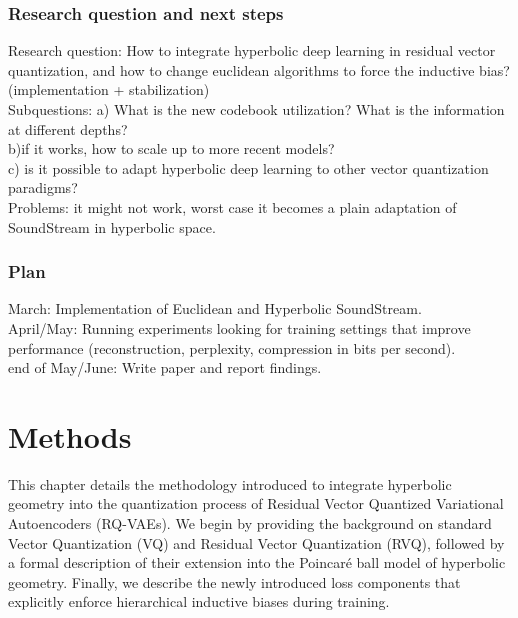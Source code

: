 \documentclass[12pt]{report}
\begin{document}
\subsection{Research question and next steps}
Research question: How to integrate hyperbolic deep learning in residual vector quantization, and how to change euclidean algorithms to force the inductive bias? (implementation + stabilization) \\
Subquestions: a) What is the new codebook utilization? What is the information at different depths? \\
b)if it works, how to scale up to more recent models? \\
c) is it possible to adapt hyperbolic deep learning to other vector quantization paradigms? \\
Problems: it might not work, worst case it becomes a plain adaptation of SoundStream in hyperbolic space.
\subsection{Plan}
March: Implementation of Euclidean and Hyperbolic SoundStream. \\
April/May: Running experiments looking for training settings that improve performance (reconstruction, perplexity, compression in bits per second). \\
end of May/June: Write paper and report findings.

\chapter{Methods}

This chapter details the methodology introduced to integrate hyperbolic geometry into the quantization process of Residual Vector Quantized Variational Autoencoders (RQ-VAEs). We begin by providing the background on standard Vector Quantization (VQ) and Residual Vector Quantization (RVQ), followed by a formal description of their extension into the Poincar\'e ball model of hyperbolic geometry. Finally, we describe the newly introduced loss components that explicitly enforce hierarchical inductive biases during training.
\end{document}
